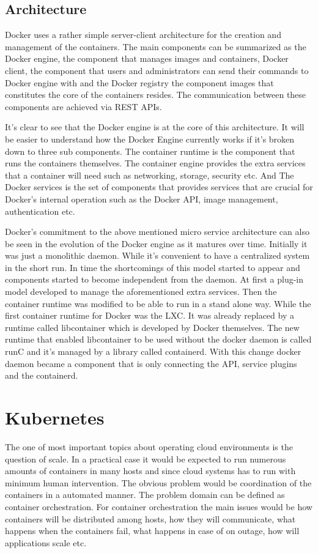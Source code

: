 \documentclass[12pt,oneandhalf,chaparabic,ceng,ms,eng,oneside,pntc]{gsufbe}
\begin{document}
\subsection{Architecture}
Docker uses a rather simple server-client architecture for the creation and management of the
containers. The main components can be summarized as the Docker engine, the component that manages
images and containers, Docker client, the component that users and administrators can send their
commands to Docker engine with and the Docker registry the component images that constitutes the core of
the containers resides. The communication between these components are achieved via REST APIs.

It's clear to see that the Docker engine is at the core of this architecture. It will be easier to
understand how the Docker Engine currently works if it's broken down to three sub components. The
container runtime is the component that runs the containers themselves. The container engine provides
the extra services that a container will need such as networking, storage, security etc. And The Docker 
services is the set of components that provides services that are crucial for Docker's internal
operation such as the Docker API, image management, authentication etc.

Docker's commitment to the above mentioned micro service architecture can also be seen in the evolution
of the Docker engine as it matures over time. Initially it was just a monolithic daemon. While it's
convenient to have a centralized system in the short run. In time the shortcomings of this model
started to appear and components started to become independent from the daemon. At first a plug-in
model developed to manage the aforementioned extra services. Then the container runtime was modified to
be able to run in a stand alone way. While the first container runtime for Docker was the LXC. It was
already replaced by a runtime called libcontainer which is developed by Docker themselves. The new
runtime that enabled libcontainer to be used without the docker daemon is called runC and it's managed
by a library called containerd. With this change docker daemon became a component that is only
connecting the API, service plugins and the containerd.

\section{Kubernetes}
The one of most important topics about operating cloud environments is the question of scale. In a
practical case it would be expected to run numerous amounts of containers in many hosts and since
cloud systems has to run with minimum human intervention. The obvious problem would be coordination
of the containers in a automated manner. The problem domain can be defined as container orchestration.
For container orchestration the main issues would be how containers will be distributed among hosts,
how they will communicate, what happens when the containers fail, what happens in case of on outage,
how will applications scale etc.
\end{document}
